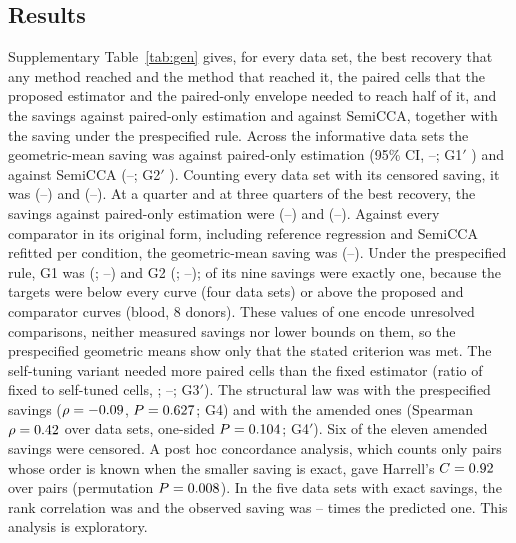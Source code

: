 \subsection*{Results}
Supplementary Table~\ref{tab:gen} gives, for every data set, the best recovery that any method reached and the method that reached it, the paired cells that the proposed estimator and the paired-only envelope needed to reach half of it, and the savings against paired-only estimation and against SemiCCA, together with the saving under the prespecified rule. Across the \GenNInformative{} informative data sets the geometric-mean saving was \GenGOne{} against paired-only estimation (95\% CI, \GenGOneLo--\GenGOneHi; G1$'$ \GenGOneMet) and \GenGTwo{} against SemiCCA (\GenGTwoLo--\GenGTwoHi; G2$'$ \GenGTwoMet). Counting every data set with its censored saving, it was \GenGOneAll{} (\GenGOneAllLo--\GenGOneAllHi) and \GenGTwoAll{} (\GenGTwoAllLo--\GenGTwoAllHi). At a quarter and at three quarters of the best recovery, the savings against paired-only estimation were \GenGOneQuarter{} (\GenGOneQuarterLo--\GenGOneQuarterHi) and \GenGOneThreeQuarters{} (\GenGOneThreeQuartersLo--\GenGOneThreeQuartersHi). Against every comparator in its original form, including reference regression and SemiCCA refitted per condition, the geometric-mean saving was \GenGOriginal{} (\GenGOriginalLo--\GenGOriginalHi). Under the prespecified rule, G1 was \GenFrozenGOneMet{} (\GenFrozenGOne; \GenFrozenGOneLo--\GenFrozenGOneHi) and G2 \GenFrozenGTwoMet{} (\GenFrozenGTwo; \GenFrozenGTwoLo--\GenFrozenGTwoHi); \GenFrozenNTrivial{} of its nine savings were exactly one, because the targets were below every curve (four data sets) or above the proposed and comparator curves (blood, 8 donors). These values of one encode unresolved comparisons, neither measured savings nor lower bounds on them, so the prespecified geometric means show only that the stated criterion was met. The self-tuning variant needed more paired cells than the fixed estimator (ratio of fixed to self-tuned cells, \GenGThree; \GenGThreeLo--\GenGThreeHi; G3$'$). The structural law was \GenLawFrozenMet{} with the prespecified savings ($\rho=-0.09$, $P=0.627$; G4) and \GenLawMet{} with the amended ones (Spearman $\rho=0.42$ over \GenLawN{} data sets, one-sided $P=0.104$; G4$'$). Six of the eleven amended savings were censored. A post hoc concordance analysis, which counts only pairs whose order is known when the smaller saving is exact, gave Harrell's\cite{harrell1982} $C=0.92$ over \GenLawCPairs{} pairs (permutation $P=0.008$). In the five data sets with exact savings, the rank correlation was \GenLawUncensoredRho{} and the observed saving was \GenLawRatioMin--\GenLawRatioMax{} times the predicted one. This analysis is exploratory.

